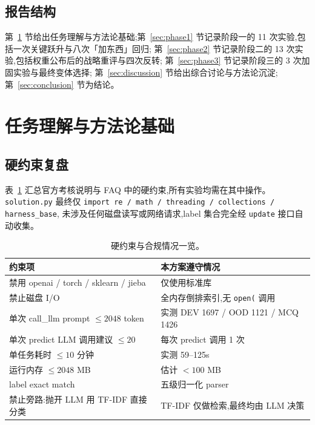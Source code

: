 \documentclass[11pt,a4paper]{ctexart}
\begin{document}
\subsection{报告结构}

第~\ref{sec:methodology} 节给出任务理解与方法论基础;第~\ref{sec:phase1} 节记录阶段一的 11 次实验,包括一次关键跃升与八次「加东西」回归;
第~\ref{sec:phase2} 节记录阶段二的 13 次实验,包括权重公布后的战略重评与四次反转;
第~\ref{sec:phase3} 节记录阶段三的 3 次加固实验与最终变体选择;
第~\ref{sec:discussion} 节给出综合讨论与方法论沉淀;第~\ref{sec:conclusion} 节为结论。

\section{任务理解与方法论基础}\label{sec:methodology}

\subsection{硬约束复盘}

表~\ref{tab:constraints} 汇总官方考核说明与 FAQ 中的硬约束,所有实验均需在其中操作。
\texttt{solution.py} 最终仅 \texttt{import re / math / threading / collections / harness\_base},
未涉及任何磁盘读写或网络请求,label 集合完全经 \texttt{update} 接口自动收集。

\begin{table}[h]
\centering
\small
\begin{tabular}{ll}
\toprule
\textbf{约束项} & \textbf{本方案遵守情况} \\
\midrule
禁用 openai / torch / sklearn / jieba & 仅使用标准库 \\
禁止磁盘 I/O                         & 全内存倒排索引,无 \texttt{open(} 调用 \\
单次 call\_llm prompt $\le 2048$ token & 实测 DEV 1697 / OOD 1121 / MCQ 1426 \\
单次 predict LLM 调用建议 $\le 20$   & 每次 predict 调用 1 次 \\
单任务耗时 $\le 10$ 分钟              & 实测 59--125s \\
运行内存 $\le 2048$ MB                & 估计 $<100$ MB \\
label exact match                    & 五级归一化 parser \\
禁止旁路:抛开 LLM 用 TF-IDF 直接分类 & TF-IDF 仅做检索,最终均由 LLM 决策 \\
\bottomrule
\end{tabular}
\caption{硬约束与合规情况一览。}
\label{tab:constraints}
\end{table}
\end{document}

